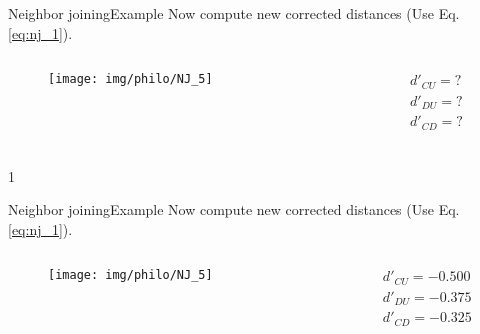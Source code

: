 \documentclass[10pt]{beamer}
\def\mysol{0}
\def\mysol{1}
\newcommand{\1}{
	\setbeamertemplate{background}{
		\texttt{[image: img/1]}
		\tikz[overlay] \fill[fill opacity=0.75,fill=white] (0,0) rectangle (-\paperwidth,\paperheight);
	}
}
\begin{document}

\begin{frame}{Neighbor joining}{Example}
	Now compute new corrected distances (Use Eq. \ref{eq:nj_1}).
	\begin{columns}
		\begin{column}{0.48\textwidth}
			\begin{figure}
				\texttt{[image: img/philo/NJ\_5]}
			\end{figure}
		\end{column}
		\begin{column}{0.48\textwidth}
			\begin{equation*}
			\begin{split}
			d'_{CU} = ? \\
			d'_{DU} = ? \\
			d'_{CD} = ? \\
			\end{split}
			\end{equation*} 	
		\end{column}
	\end{columns}
\end{frame}


\if\mysol1
\begin{frame}{Neighbor joining}{Example}
	Now compute new corrected distances (Use Eq. \ref{eq:nj_1}).
	\begin{columns}
		\begin{column}{0.48\textwidth}
			\begin{figure}
				\texttt{[image: img/philo/NJ\_5]}
			\end{figure}
		\end{column}
		\begin{column}{0.48\textwidth}
			\begin{equation*}
			\begin{split}
			d'_{CU} = -0.500 \\
			d'_{DU} = -0.375 \\
			d'_{CD} = -0.325 \\
			\end{split}
			\end{equation*} 	
		\end{column}
	\end{columns}
\end{frame}
\fi
\end{document}
